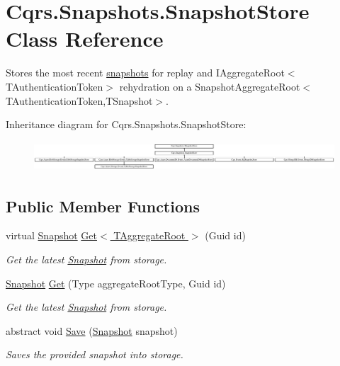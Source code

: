 \hypertarget{classCqrs_1_1Snapshots_1_1SnapshotStore}{}\section{Cqrs.\+Snapshots.\+Snapshot\+Store Class Reference}
\label{classCqrs_1_1Snapshots_1_1SnapshotStore}


Stores the most recent \hyperlink{classCqrs_1_1Snapshots_1_1Snapshot}{snapshots} for replay and I\+Aggregate\+Root$<$\+T\+Authentication\+Token$>$ rehydration on a Snapshot\+Aggregate\+Root$<$\+T\+Authentication\+Token,\+T\+Snapshot$>$.  


Inheritance diagram for Cqrs.\+Snapshots.\+Snapshot\+Store\+:\begin{figure}[H]
\begin{center}
\leavevmode
\includegraphics[height=1.137056cm]{classCqrs_1_1Snapshots_1_1SnapshotStore}
\end{center}
\end{figure}
\subsection*{Public Member Functions}
\begin{DoxyCompactItemize}
\item 
virtual \hyperlink{classCqrs_1_1Snapshots_1_1Snapshot}{Snapshot} \hyperlink{classCqrs_1_1Snapshots_1_1SnapshotStore_af35423c44786c31d224d52c3796d0d3d_af35423c44786c31d224d52c3796d0d3d}{Get$<$ T\+Aggregate\+Root $>$} (Guid id)
\begin{DoxyCompactList}\small\item\em Get the latest \hyperlink{classCqrs_1_1Snapshots_1_1Snapshot}{Snapshot} from storage. \end{DoxyCompactList}\item 
\hyperlink{classCqrs_1_1Snapshots_1_1Snapshot}{Snapshot} \hyperlink{classCqrs_1_1Snapshots_1_1SnapshotStore_a08ec0d8ff97742e3503a3778bb92076e_a08ec0d8ff97742e3503a3778bb92076e}{Get} (Type aggregate\+Root\+Type, Guid id)
\begin{DoxyCompactList}\small\item\em Get the latest \hyperlink{classCqrs_1_1Snapshots_1_1Snapshot}{Snapshot} from storage. \end{DoxyCompactList}\item 
abstract void \hyperlink{classCqrs_1_1Snapshots_1_1SnapshotStore_ae96ea2bb89a0bd7f45544acc37107525_ae96ea2bb89a0bd7f45544acc37107525}{Save} (\hyperlink{classCqrs_1_1Snapshots_1_1Snapshot}{Snapshot} snapshot)
\begin{DoxyCompactList}\small\item\em Saves the provided {\itshape snapshot}  into storage. \end{DoxyCompactList}\end{DoxyCompactItemize}
